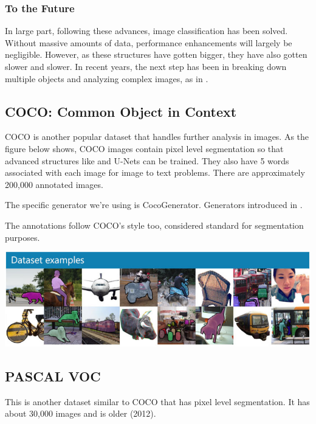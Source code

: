 \subsubsection{To the Future}
In large part, following these advances, image classification has been solved. Without massive amounts of data, performance enhancements will largely be negligible. However, as these structures have gotten bigger, they have also gotten slower and slower. In recent years, the next step has been in breaking down multiple objects and analyzing complex images, as in .

\subsection{COCO: Common Object in Context}\label{s:coco}
COCO is another popular dataset that handles further analysis in images. As the figure below shows, COCO images contain pixel level segmentation so that advanced structures like \maskrcnn and U-Nets can be trained. They also have 5 words associated with each image for image to text problems. There are approximately 200,000 annotated images.

The specific generator we're using is CocoGenerator. Generators introduced in .

The \modanet annotations follow COCO's style too, considered standard for segmentation purposes.

\begin{center}
	\includegraphics[scale=0.45]{images/coco.PNG}
\end{center}

\subsection{PASCAL VOC}\label{s:voc}
This is another dataset similar to COCO that has pixel level segmentation. It has about 30,000 images and is older (2012).